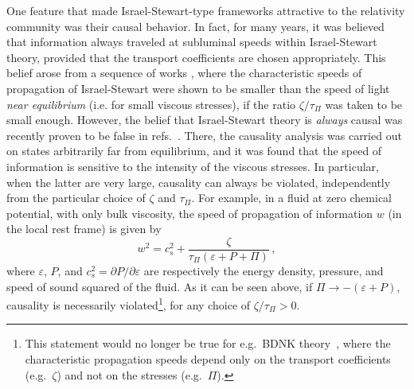 \documentclass[aps, prd, showkeys,superscriptaddress, nofootinbib,floatfix]{revtex4-2}
\begin{document}
One feature that made Israel-Stewart-type frameworks attractive to the relativity community was their causal behavior. In fact, for many years, it was believed that information always traveled at subluminal speeds within Israel-Stewart theory, provided that the transport coefficients are chosen appropriately. This belief arose from a sequence of works \cite{Hishcock1983,OlsonLifsh1990,Pu:2009fj}, where the characteristic speeds of propagation of Israel-Stewart were shown to be smaller than the speed of light \emph{near equilibrium} (i.e. for small viscous stresses), if the ratio $\zeta/\tau_\Pi$ was taken to be small enough. However, the belief that Israel-Stewart theory is \textit{always} causal was recently proven to be false in refs.~\cite{Bemfica:2019cop,Bemfica:2020xym}. There, the causality analysis was carried out on states arbitrarily far from equilibrium, and it was found that the speed of information is sensitive to the intensity of the viscous stresses. In particular, when the latter are very large, causality can always be violated, independently from the particular choice of $\zeta$ and $\tau_\Pi$. For example, in a fluid at zero chemical potential, with only bulk viscosity, the speed of propagation of information $w$ (in the local rest frame) is given by
\begin{equation}\label{bulkione}
w^2=c_s^2 +\dfrac{\zeta}{\tau_\Pi (\varepsilon{+}P{+}\Pi)} \, ,
\end{equation}
where $\varepsilon$, $P$, and $c_s^2 = \partial P/\partial \varepsilon$ are respectively the energy density, pressure, and speed of sound squared of the fluid.
As it can be seen above, if $\Pi \rightarrow -(\varepsilon{+}P)$, causality is necessarily violated\footnote{This statement would no longer be true for e.g.~BDNK theory~\cite{Bemfica:2017wps, Bemfica:2019knx, Bemfica:2020zjp, Kovtun:2019hdm}, where the characteristic propagation speeds depend only on the transport coefficients (e.g.~$\zeta$) and not on the stresses (e.g.~$\Pi$).}, for any choice of $\zeta/\tau_\Pi > 0$. 
\end{document}
